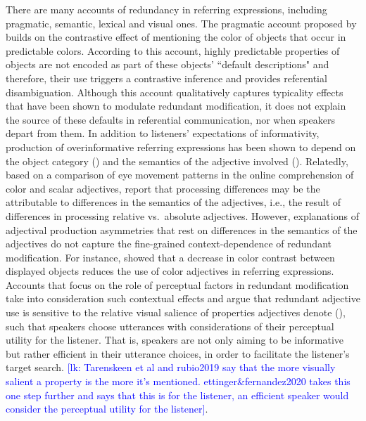 \documentclass[12pt,letterpaper]{article}
\newcommand{\lk}[1]{\textcolor{Blue}{[lk: #1]}}
\begin{document}
There are many accounts of redundancy in referring expressions, including pragmatic, semantic, lexical and visual ones. The pragmatic account proposed by \citet{Sedivy2003} builds on the contrastive effect of mentioning the color of objects that occur in predictable colors. According to this account, highly predictable properties of objects are not encoded as part of these objects' ``default descriptions" and therefore, their use triggers a contrastive inference and provides referential disambiguation. Although this account qualitatively captures typicality effects that have been shown to modulate redundant modification, it does not explain the source of these defaults in referential communication, nor when speakers depart from them. In addition to listeners' expectations of informativity, production of overinformative referring expressions has been shown to depend on the object category (\citealt{RubioFernandez2016}) and the semantics of the adjective involved (\citealt{RubioEtAl2019, Sedivy2003}). Relatedly, based on a comparison of eye movement patterns in the online comprehension of color and scalar adjectives, \citet{AparicioEtAl2018} report that processing  differences may be the attributable to differences in the semantics of the adjectives, i.e., the result of differences in processing relative vs.~absolute adjectives. However, explanations of adjectival production asymmetries that rest on differences in the semantics of the adjectives do not capture the fine-grained context-dependence of redundant modification. For instance, \citet{ViethenEtAl2017} showed that  a decrease in color contrast between displayed objects reduces the use of color adjectives in referring expressions. Accounts that focus on the role of perceptual factors in redundant modification take into consideration such contextual effects and argue that redundant adjective use is sensitive to the relative visual salience of properties  adjectives denote (\citealt{Taranskeen2015, RubioEtAl2019,EttingerFernandez2020}), such that speakers choose utterances with considerations of their perceptual utility for the listener. That is, speakers are not only aiming to be informative but rather efficient in their utterance choices, in order to facilitate the listener's target search. \lk{Tarenskeen et al and rubio2019 say that the more visually salient a property is the more it's mentioned. ettinger\&fernandez2020 takes this one step further and says that this is for the listener, an efficient speaker would consider the perceptual utility for the listener}. 
\end{document}
